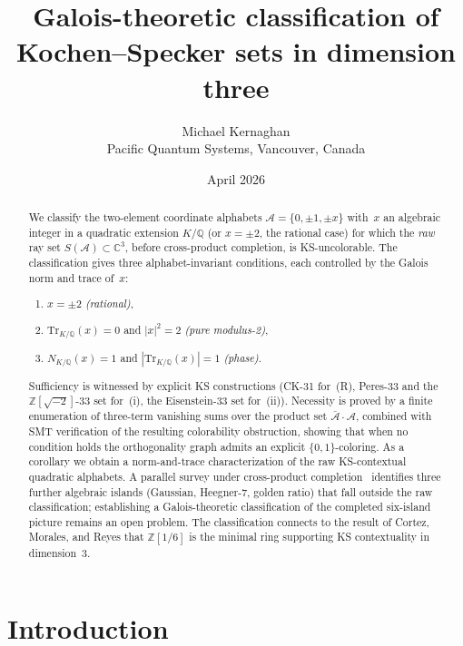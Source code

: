 \documentclass[12pt,a4paper]{article}
\newcommand{\C}{\mathbb{C}}
\newcommand{\Z}{\mathbb{Z}}
\newcommand{\Q}{\mathbb{Q}}
\newcommand{\Norm}[1]{N_{K/\Q}\!\left(#1\right)}
\newcommand{\Tr}[1]{\mathrm{Tr}_{K/\Q}\!\left(#1\right)}
\begin{document}
\title{Galois-theoretic classification of Kochen--Specker sets
in dimension three}

\author{Michael Kernaghan\\
\small Pacific Quantum Systems, Vancouver, Canada}

\date{April 2026}

\maketitle

\begin{abstract}
\noindent
We classify the two-element coordinate alphabets
$\mathcal{A} = \{0, \pm 1, \pm x\}$ with~$x$ an algebraic integer in a
quadratic extension $K/\Q$ (or $x = \pm 2$, the rational case) for
which the \emph{raw} ray set $S(\mathcal{A}) \subset \C^3$, before
cross-product completion, is KS-uncolorable.  The classification gives
three alphabet-invariant conditions, each controlled by the Galois
norm and trace of~$x$:
\begin{enumerate}
\item[(R)]  $x = \pm 2$ \emph{(rational)},
\item[(i)]  $\Tr{x} = 0$ and $|x|^2 = 2$ \emph{(pure modulus-2)},
\item[(ii)] $\Norm{x} = 1$ and $|\Tr{x}| = 1$ \emph{(phase)}.
\end{enumerate}
Sufficiency is witnessed by explicit KS constructions (CK-31 for~(R),
Peres-33 and the $\Z[\sqrt{-2}]$-33 set for~(i), the Eisenstein-33 set
for~(ii)).  Necessity is proved by a finite enumeration of three-term
vanishing sums over the product set $\bar{\mathcal{A}} \cdot
\mathcal{A}$, combined with SMT verification of the resulting
colorability obstruction, showing that when no condition holds the
orthogonality graph admits an explicit $\{0,1\}$-coloring.  As a
corollary we obtain a norm-and-trace characterization of the raw
KS-contextual quadratic alphabets.  A parallel survey under cross-product
completion~\cite{Kernaghan2026islands} identifies three further
algebraic islands (Gaussian, Heegner-7, golden ratio) that fall outside
the raw classification; establishing a Galois-theoretic classification
of the completed six-island picture remains an open problem.  The
classification connects to the result of Cortez, Morales, and Reyes
that $\Z[1/6]$ is the minimal ring supporting KS contextuality in
dimension~3.
\end{abstract}

\section{Introduction}
\end{document}
